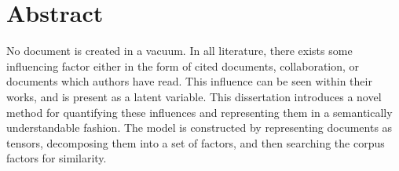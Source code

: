 \chapter*{Abstract}\label{ch:abstract}
No document is created in a vacuum.  In all literature, there exists
some influencing factor either in the form of cited documents,
collaboration, or documents which authors have read.  This influence
can be seen within their works, and is present as a latent variable.
This dissertation introduces a novel method for quantifying these influences
and representing them in a semantically understandable fashion.  The
model is constructed by representing documents as tensors, decomposing
them into a set of factors, and then searching the corpus factors for
similarity.  
